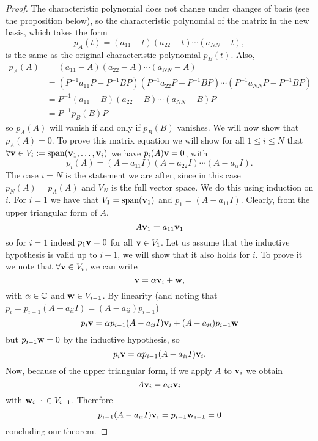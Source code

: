 \documentclass[10pt, a4paper]{article}
\begin{document}
\begin{theorem}
\begin{proof}
        The characteristic polynomial does not change under changes of basis
        (see the proposition below),
        so the characteristic polynomial of the matrix in the new basis,
        which takes the form
        \[
        p_A(t) = (a_{11} - t)(a_{22} - t) \dotsi (a_{NN} - t),
        \]
        is the same as the original characteristic polynomial $p_B(t)$.
        Also,
        \begin{align*}
            p_A(A) &= (a_{11} - A)(a_{22} - A) \dotsi (a_{NN} - A) \\
            &= (P ^ {-1}a_{11}P - P ^ {-1}BP)(P ^ {-1}a_{22}P - P ^ {-1}BP) \dotsi (P ^ {-1}a_{NN}P - P ^ {-1}BP) \\
            &= P ^ {-1}(a_{11} - B)(a_{22} - B) \dotsi (a_{NN} - B)P \\
            &= P ^ {-1}p_B(B)P
        \end{align*}
        so $p_A(A)$ will vanish if and only if $p_B(B)$ vanishes.
        We will now show that $p_A(A) = 0$.
        To prove this matrix equation we will show for all $1 \leq i \leq N$ that $\forall \mathbf{v} \in V_i := \mathrm{span}(\mathbf{v}_1, \dotsc, \mathbf{v}_i)$ we have $p_i(A)\mathbf{v} = 0$,
        with
        \[
        p_i(A) = (A - a_{11}I)(A - a_{22}I) \dotsi (A - a_{ii}I).
        \]
        The case $i = N$ is the statement we are after,
        since in this case $p_N(A) = p_A(A)$ and $V_N$ is the full vector space.
        We do this using induction on $i$.
        For $i = 1$ we have that $V_1 = \mathrm{span}(\mathbf{v}_1)$ and $p_1 = (A - a_{11}I)$.
        Clearly,
        from the upper triangular form of $A$,
        \[
        A\mathbf{v}_1 = a_{11}\mathbf{v}_1
        \]
        so for $i = 1$ indeed $p_1\mathbf{v} = 0$ for all $\mathbf{v} \in V_1$.
        Let us assume that the inductive hypothesis is valid up to $i - 1$,
        we will show that it also holds for $i$.
        To prove it we note that $\forall \mathbf{v} \in V_i$,
        we can write
        \[
        \mathbf{v} = \alpha\mathbf{v}_i + \mathbf{w},
        \]
        with $\alpha \in \mathbb{C}$ and $\mathbf{w} \in V_{i - 1}$.
        By linearity
        (and noting that $p_i = p_{i - 1}(A - a_{ii}I) = (A - a_{ii})p_{i - 1}$)
        \[
        p_i\mathbf{v} = \alpha p_{i - 1}(A - a_{ii}I)\mathbf{v}_i + (A - a_{ii})p_{i - 1}\mathbf{w}
        \]
        but $p_{i - 1}\mathbf{w} = 0$ by the inductive hypothesis,
        so
        \[
        p_i\mathbf{v} = \alpha p_{i - 1}(A - a_{ii}I)\mathbf{v}_i.
        \]
        Now,
        because of the upper triangular form,
        if we apply $A$ to $\mathbf{v}_i$ we obtain
        \[
        A\mathbf{v}_i = a_{ii}\mathbf{v}_i
        \]
        with $\mathbf{w}_{i - 1} \in V_{i - 1}$.
        Therefore
        \[
        p_{i - 1}(A - a_{ii}I)\mathbf{v}_i = p_{i - 1}\mathbf{w}_{i - 1} = 0
        \]
        concluding our theorem.
    \end{proof}
\end{theorem}
\end{document}
